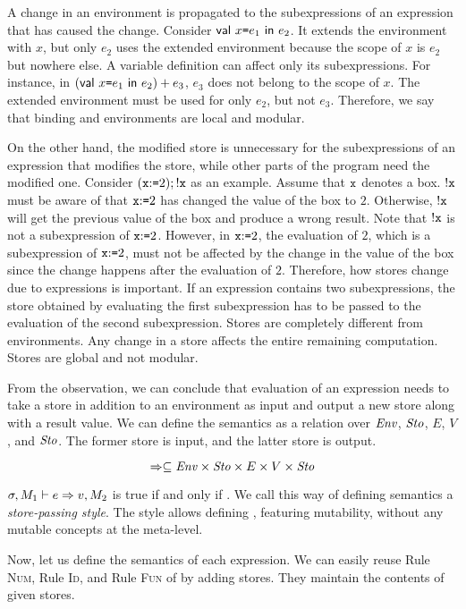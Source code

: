 A change in an environment is propagated to the subexpressions of an expression
that has caused the change. Consider $\textsf{val}\ x\texttt{=} e_1\ \textsf{in}\ e_2$.
It extends the environment with $x$, but only $e_2$ uses the
extended environment because the scope of $x$ is $e_2$ but nowhere else.
A variable definition can affect only its subexpressions.
For instance, in $(\textsf{val}\ x\texttt{=} e_1\ \textsf{in}\ e_2)+e_3$, $e_3$ does not belong to
the scope of $x$. The extended environment must be used for only $e_2$, but not
$e_3$. Therefore, we say that binding and environments are local and modular.

On the other hand, the modified store is unnecessary for the subexpressions of an
expression that modifies the store, while other parts of the program need
the modified one. Consider $(\texttt{x}{:}\texttt{=}2);!\texttt{x}$ as an example.
Assume that $\texttt{x}$ denotes a box.
$!\texttt{x}$ must be aware of that $\texttt{x}{:}\texttt{=}2$ has changed the value of the box
to $2$. Otherwise, $!\texttt{x}$ will get the previous value of the box and
produce a wrong result. Note that $!\texttt{x}$ is not a subexpression of
$\texttt{x}{:}\texttt{=}2$. However, in $\texttt{x}{:}\texttt{=}2$, the evaluation of $2$, which is a
subexpression of $\texttt{x}{:}\texttt{=}2$, must not be affected by the change in the value
of the box since the change happens after the evaluation of $2$. Therefore,
how stores change due to expressions is important. If an expression contains two
subexpressions, the store obtained by evaluating the first subexpression has to be
passed to the evaluation of the second subexpression. Stores are completely
different from environments. Any change in a store affects the entire remaining
computation. Stores are global and not modular.

From the observation, we can conclude that evaluation of an expression needs to
take a store in addition to an environment as input and output a new store along
with a result value. We can define the semantics as a
relation over $\mbox{\emph{Env}}$, $\mbox{\emph{Sto}}$, $E$, $V$, and $\mbox{\emph{Sto}}$.
The former store is input, and the latter store is output.

\[\Rightarrow\subseteq\mbox{\emph{Env}}\times\mbox{\emph{Sto}}\times E\times V\times\mbox{\emph{Sto}}\]

$\sigma,M_{1}\vdash e\Rightarrow v,M_{2}$ is true if and only if .
We call this way of defining semantics a \textit{store-passing
style}. The style allows defining \lang, featuring
mutability, without any mutable concepts at the meta-level.

Now, let us define the semantics of each expression. We can easily reuse Rule
\textsc{Num}, Rule \textsc{Id}, and Rule \textsc{Fun} of \lang by adding stores.
They maintain the contents of given stores.

